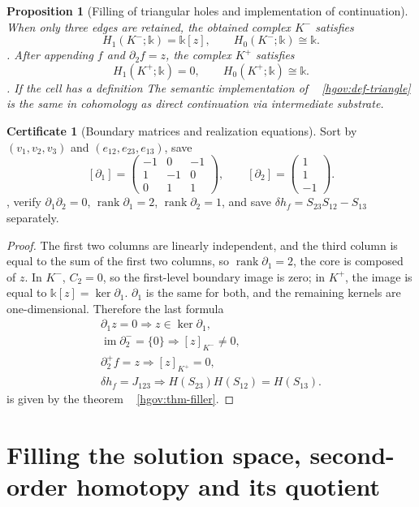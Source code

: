 \documentclass[12pt,a4paper,openany,notitlepage]{report}
\theoremstyle{plain}
\newtheorem{proposition}[theorem]{Proposition}
\theoremstyle{definition}
\newtheorem*{certificate}{Certificate}
\theoremstyle{remark}
\begin{document}
\begin{CJK*}
\begin{proposition}
[Filling of triangular holes and implementation of continuation]\label{hgov:prop-triangle}
When only three edges are retained, the obtained complex $K^-$ satisfies \[
 H_1(K^-;\mathbb k)=\mathbb k[z],\qquad
 H_0(K^-;\mathbb k)\cong\mathbb k.
\]. After appending $f$ and $\partial_2f=z$, the complex $K^+$ satisfies \[
 H_1(K^+;\mathbb k)=0,\qquad
 H_0(K^+;\mathbb k)\cong\mathbb k.
\]. If the cell has a definition The semantic implementation of ~ \ref{hgov:def-triangle} is the same in cohomology as direct continuation via intermediate substrate.\end{proposition}
\begin{certificate}
[Boundary matrices and realization equations]Sort by $(v_1,v_2,v_3)$ and $(e_{12},e_{23},e_{13})$, save \[
 [\partial_1]=
 \begin{pmatrix}-1&0&-1\\1&-1&0\\0&1&1\end{pmatrix},
 \qquad
 [\partial_2]=\begin{pmatrix}1\\1\\-1\end{pmatrix}.
\], verify $\partial_1\partial_2=0$, $\operatorname{rank}\partial_1=2$, $\operatorname{rank}\partial_2=1$, and save $\delta h_f=S_{23}S_{12}-S_{13}$ separately.\end{certificate}
\begin{proof}
The first two columns are linearly independent, and the third column is equal to the sum of the first two columns, so $\operatorname{rank}\partial_1=2$, the core is composed of $z$. In $K^-$, $C_2=0$, so the first-level boundary image is zero; in $K^+$, the image is equal to $\mathbb k[z]=\ker\partial_1$. $\partial_1$ is the same for both, and the remaining kernels are one-dimensional. Therefore the last formula \[
 \begin{gathered}
 \partial_1z=0
 \Longrightarrow z\in\ker\partial_1,\\
 \operatorname{im}\partial_2^-=\{0\}
 \Longrightarrow[z]_{K^-}\ne0,\\
 \partial_2^+f=z
 \Longrightarrow[z]_{K^+}=0,\\
 \delta h_f=J_{123}
 \Longrightarrow H(S_{23})H(S_{12})=H(S_{13}).
 \end{gathered}
\] is given by the theorem ~ \ref{hgov:thm-filler}.\end{proof}


\section { Filling the solution space, second-order homotopy and its quotient }\label{exp:hom:fill-space}



\end{CJK*}
\end{document}
